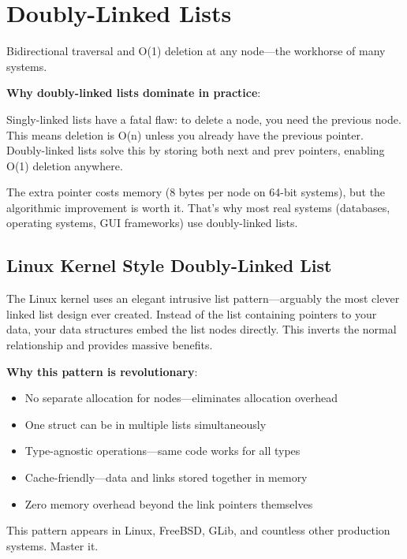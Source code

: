 \section{Doubly-Linked Lists}

Bidirectional traversal and O(1) deletion at any node—the workhorse of many systems.

\textbf{Why doubly-linked lists dominate in practice}:

Singly-linked lists have a fatal flaw: to delete a node, you need the previous node. This means deletion is O(n) unless you already have the previous pointer. Doubly-linked lists solve this by storing both next and prev pointers, enabling O(1) deletion anywhere.

The extra pointer costs memory (8 bytes per node on 64-bit systems), but the algorithmic improvement is worth it. That's why most real systems (databases, operating systems, GUI frameworks) use doubly-linked lists.

\subsection{Linux Kernel Style Doubly-Linked List}

The Linux kernel uses an elegant intrusive list pattern—arguably the most clever linked list design ever created. Instead of the list containing pointers to your data, your data structures embed the list nodes directly. This inverts the normal relationship and provides massive benefits.

\textbf{Why this pattern is revolutionary}:
\begin{itemize}
    \item No separate allocation for nodes—eliminates allocation overhead
    \item One struct can be in multiple lists simultaneously
    \item Type-agnostic operations—same code works for all types
    \item Cache-friendly—data and links stored together in memory
    \item Zero memory overhead beyond the link pointers themselves
\end{itemize}

This pattern appears in Linux, FreeBSD, GLib, and countless other production systems. Master it.

